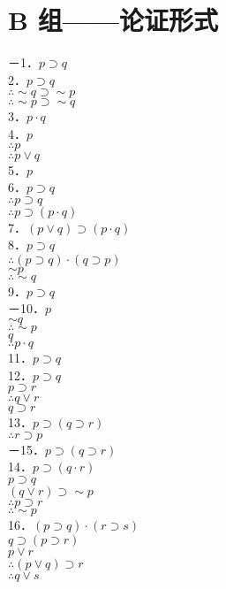 \section*{B 组——论证形式}
－1．$p \supset q$\\
2．$p \supset q$\\
$\therefore \sim q \supset \sim p$\\
$\therefore \sim p \supset \sim q$\\
3．$p \cdot q$\\
4．$p$\\
$\therefore p$\\
$\therefore p \vee q$\\
5．$p$\\
6．$p \supset q$\\
$\therefore p \supset q$\\
$\therefore p \supset(p \cdot q)$\\
7．$(p \vee q) \supset(p \cdot q)$\\
8．$p \supset q$\\
$\therefore(p \supset q) \cdot(q \supset p)$\\
$\sim p$\\
$\therefore \sim q$\\
9．$p \supset q$\\
－10．$p$\\
$\sim q$\\
$\therefore \sim p$\\
$q$\\
$\therefore p \cdot q$\\
11．$p \supset q$\\
12．$p \supset q$\\
$p \supset r$\\
$\therefore q \vee r$\\
$q \supset r$\\
13．$p \supset(q \supset r)$\\
$\therefore r \supset p$\\
－15．$p \supset(q \supset r)$\\
14．$p \supset(q \cdot r)$\\
$p \supset q$\\
$(q \vee r) \supset \sim p$\\
$\therefore p \supset r$\\
$\therefore \sim p$\\
16．$(p \supset q) \cdot(r \supset s)$\\
$q \supset(p \supset r)$\\
$p \vee r$\\
$\therefore(p \vee q) \supset r$\\
$\therefore q \vee s$

